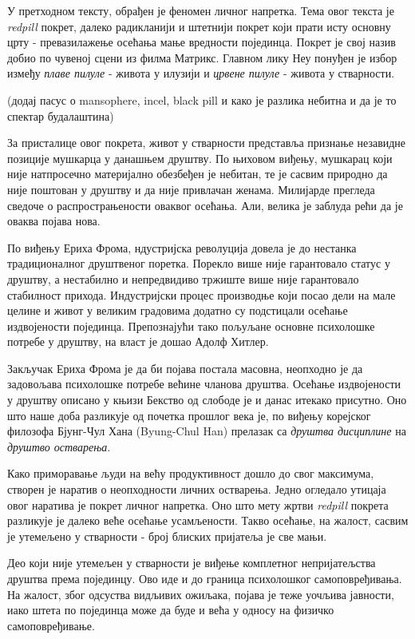 \documentclass[b5paper]{article}
\begin{document}
\large

У претходном тексту, обрађен је феномен личног напретка. Тема овог текста је \textit{redpill} покрет, далеко радикланији и штетнији покрет који прати исту основну црту - превазилажење осећања мање вредности појединца. Покрет је свој назив добио по чувеној сцени из филма Матрикс. Главном лику Неу понуђен је избор између \textit{плаве пилуле} - живота у илузији и \textit{црвене пилуле} - живота у стварности.

(додај пасус о mansophere, incel, black pill и како је разлика небитна и да је то спектар будалаштина)

За присталице овог покрета, живот у стварности представља признање незавидне позиције мушкарца у данашњем друштву. По њиховом виђењу, мушкарац који није натпросечно материјално обезбеђен је небитан, те је сасвим природно да није поштован у друштву и да није привлачан женама. Милијарде прегледа сведоче о распрострањености оваквог осећања. Али, велика је заблуда рећи да је оваква појава нова.

По виђењу Ериха Фрома, ндустријска револуција довела је до нестанка традиционалног друштвеног поретка. Порекло више није гарантовало статус у друштву, а нестабилно и непредвидиво тржиште више није гарантовало стабилност прихода. Индустријски процес производње који посао дели на мале целине и живот у великим градовима додатно су подстицали осећање издвојености појединца. Препознајући тако пољуљане основне психолошке потребе у друштву, на власт је дошао Адолф Хитлер.

Закључак Ериха Фрома је да би појава постала масовна, неопходно је да задовољава психолошке потребе већине чланова друштва. Осећање издвојености у друштву описано у књизи Бекство од слободе је и данас итекако присутно. Оно што наше доба разликује од почетка прошлог века је, по виђењу корејског филозофа Бјунг-Чул Хана (Byung-Chul Han) прелазак са \textit{друштва дисциплине} на \textit{друштво остварења}.

Како приморавање људи на већу продуктивност дошло до свог максимума, створен је наратив о неопходности личних остварења. Једно огледало утицаја овог наратива је покрет личног напретка. Оно што мету жртви \textit{redpill} покрета разликује је далеко веће осећање усамљености. Такво осећање, на жалост, сасвим је утемељено у стварности - број блиских пријатеља је све мањи.

Део који није утемељен у стварности је виђење комплетног непријатељства друштва према појединцу. Ово иде и до граница психолошког самоповређивања. На жалост, због одсуства видљивих ожиљака, појава је теже уочљива јавности, иако штета по појединца може да буде и већа у односу на физичко самоповређивање.
\end{document}
